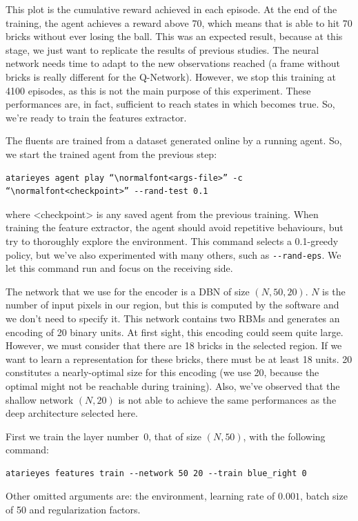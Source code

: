 This plot is the cumulative reward achieved in each episode. At the end of the
training, the agent achieves a reward above 70, which means that is able to
hit 70 bricks without ever losing the ball. This was an expected result,
because at this stage, we just want to replicate the results of previous
studies.  The neural network needs time to adapt to the new observations
reached (a frame without bricks is really different for the Q-Network).
However, we stop this training at 4100 episodes, as this is not the main
purpose of this experiment. These performances are, in fact, sufficient to
reach states in which  becomes true. So, we're ready to train the
features extractor.

The fluents are trained from a dataset generated online by a running agent.
So, we start the trained agent from the previous step:
\begin{verbatim}
atarieyes agent play “\normalfont<args-file>” -c “\normalfont<checkpoint>” --rand-test 0.1
\end{verbatim}
where <checkpoint> is any saved agent from the previous training. When
training the feature extractor, the agent should avoid repetitive behaviours,
but try to thoroughly explore the environment. This command selects a
0.1-greedy policy, but we've also experimented with many others, such as
\verb|--rand-eps|. We let this command run and focus on the receiving side.

The network that we use for the encoder is a DBN of size $(N, 50, 20)$. $N$ is
the number of input pixels in our region, but this is computed by the
software and we don't need to specify it. This network contains two RBMs and
generates an encoding of 20 binary units. At first sight, this encoding could
seem quite large. However, we must consider that there are 18 bricks in the
selected region. If we want to learn a representation for these bricks, there
must be at least 18 units. 20 constitutes a nearly-optimal size for this
encoding (we use 20, because the optimal might not be reachable during
training). Also, we've observed that the shallow network $(N, 20)$ is not able
to achieve the same performances as the deep architecture selected here.

First we train the layer number~0, that of size $(N, 50)$, with the following
command:
\begin{verbatim}
atarieyes features train --network 50 20 --train blue_right 0
\end{verbatim}
Other omitted arguments are: the environment, learning rate of $0.001$,
batch size of 50 and regularization factors.

